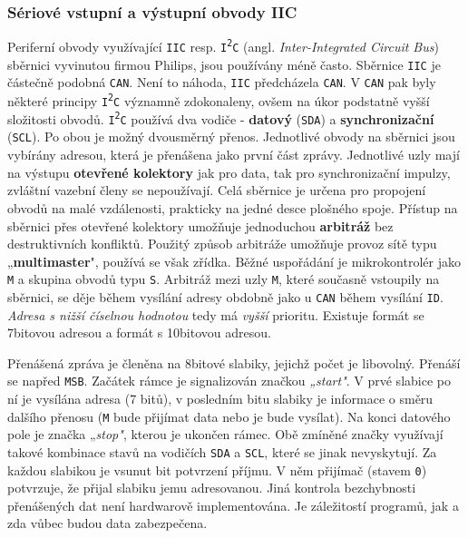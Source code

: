       \subsubsection{Sériové vstupní a výstupní obvody IIC}
        Periferní obvody využívající \texttt{IIC} resp. \texttt{I{\textsuperscript{2}}C} (angl. 
        \emph{Inter-Inte\-grated Circuit Bus}) sběrnici vyvinutou firmou Philips, jsou používány 
        méně často. Sběrnice \texttt{IIC} je částečně podobná \texttt{CAN}. Není to náhoda, 
        \texttt{IIC} předcházela \texttt{CAN}. V \texttt{CAN} pak byly některé principy 
        \texttt{I{\textsuperscript{2}}C} významně zdokonaleny, ovšem na úkor podstatně vyšší 
        složitosti obvodů. \texttt{I{\textsuperscript{2}}C} používá dva vodiče - \textbf{datový} 
        (\texttt{SDA}) a \textbf{synchronizační} (\texttt{SCL}). Po obou je možný dvousměrný 
        přenos. Jednotlivé obvody na sběrnici jsou vybírány adresou, která je přenášena jako první 
        část zprávy. Jednotlivé uzly mají na výstupu \textbf{otevřené kolektory} jak pro data, tak 
        pro synchronizační impulzy, zvláštní vazební členy se nepoužívají. Celá sběrnice je určena 
        pro propojení obvodů na malé vzdálenosti, prakticky na jedné desce plošného spoje. Přístup 
        na sběrnici přes otevřené kolektory umožňuje jednoduchou \textbf{arbitráž} bez 
        destruktivních konfliktů. Použitý způsob arbitráže umožňuje provoz sítě typu 
        „\textbf{multimaster}", používá se však zřídka. Běžné uspořádání je mikrokontrolér jako 
        \texttt{M} a skupina obvodů typu \texttt{S}. Arbitráž mezi uzly \texttt{M}, které   
        současně vstoupily na sběrnici, se  děje během vysílání adresy obdobně jako u \texttt{CAN} 
        během vysílání \texttt{ID}. \emph{Adresa s nižší číselnou hodnotou} tedy má \emph{vyšší} 
        prioritu. Existuje formát se 7bitovou adresou a formát s 10bitovou adresou.
        
        Přenášená zpráva je členěna na 8bitové slabiky, jejichž počet je libovolný. Přenáší se 
        napřed \texttt{MSB}. Začátek rámce je signalizován značkou \emph{„start"}. V prvé slabice 
        po ní je vysílána adresa (7 bitů), v posledním bitu slabiky je informace o směru dalšího 
        přenosu (\texttt{M} bude přijímat data nebo je bude vysílat). Na konci datového pole je 
        značka „\emph{stop"}, kterou je ukončen rámec. Obě zmíněné značky využívají takové 
        kombinace stavů na vodičích \texttt{SDA} a \texttt{SCL}, které se jinak nevyskytují. Za 
        každou slabikou je vsunut bit potvrzení příjmu. V něm přijímač (stavem \texttt{0}) 
        potvrzuje, že přijal slabiku jemu adresovanou. Jiná kontrola bezchybnosti přenášených dat 
        není hardwarově implementována. Je záležitostí programů, jak a zda vůbec budou data 
        zabezpečena.
        
